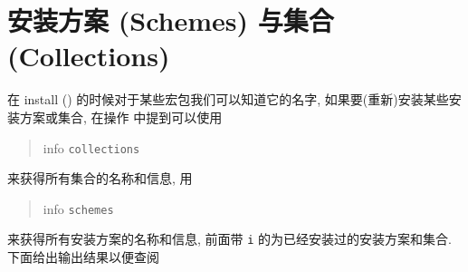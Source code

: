 \section[安装方案与集合]{安装方案 (Schemes) 与集合 (Collections)}

在 \tlmgr{} \ac{install} () 的时候对于某些宏包我们可以知道它的名字, 如果要(重新)安装某些安装方案或集合, 在操作  中提到可以使用 
\begin{quote}
    \tlmgr{} \ac{info} \texttt{collections}
\end{quote}
来获得所有集合的名称和信息, 用
\begin{quote}
    \tlmgr{} \ac{info} \texttt{schemes}
\end{quote}
来获得所有安装方案的名称和信息, 前面带 \texttt{i} 的为已经安装过的安装方案和集合. 下面给出输出结果以便查阅

